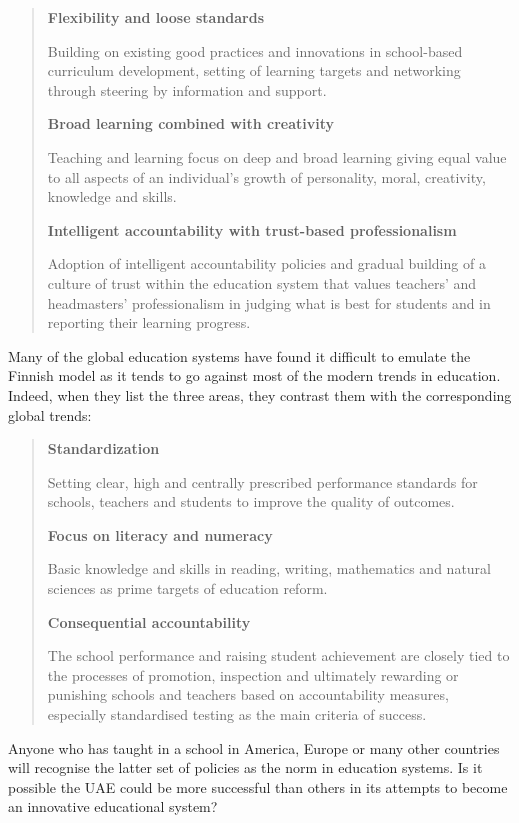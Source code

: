 \begin{quote}
\textbf{Flexibility and loose standards}

Building on existing good practices and innovations in school-based curriculum development, setting of learning targets and networking through steering by information and support.


\textbf{Broad learning combined with creativity}

Teaching and learning focus on deep and broad learning giving equal value to all aspects of an individual’s growth of personality, moral, creativity, knowledge and skills.


\textbf{Intelligent accountability with trust-based professionalism}

Adoption of intelligent accountability policies and gradual building of a culture of trust within the education system that values teachers’ and headmasters’ professionalism in judging what is best for students and in reporting their learning progress.
\end{quote}

Many of the global education systems have found it difficult to emulate the Finnish model as it tends to go against most of the modern trends in education. Indeed, when they list the three areas, they contrast them with the corresponding global trends:

\begin{quote}
\textbf{Standardization}

Setting clear, high and centrally prescribed performance standards for schools, teachers and students to improve the quality of outcomes.


\textbf{Focus on literacy and numeracy}

Basic knowledge and skills in reading, writing, mathematics and natural sciences as prime targets of education reform.


\textbf{Consequential accountability} 

The school performance and raising student achievement are closely tied to the processes of promotion, inspection and ultimately rewarding or punishing schools and teachers based on accountability measures, especially standardised testing as the main criteria of success.
\end{quote}

Anyone who has taught in a school in America, Europe or many other countries will recognise the latter set of policies as the norm in education systems. Is it possible the UAE could be more successful than others in its attempts to become an innovative educational system?

